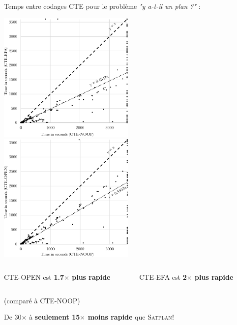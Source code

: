 \documentclass[english,french,usenames,dvipsnames]{beamer}
\begin{document}
\begin{frame}
Temps entre codages CTE pour le problème \textit{"y a-t-il un plan ?"} :

\includegraphics[width=0.5\textwidth]{figures/coplas2018/time-plansat-efa-noop3.pdf}
\includegraphics[width=0.5\textwidth]{figures/coplas2018/time-plansat-open-noop3.pdf}

\begin{columns}
\begin{column}{0.5\textwidth}
\begin{center}
CTE-OPEN est \textbf{1.7$\times$ plus rapide}
\end{center}
\end{column}
\begin{column}{0.5\textwidth}
\begin{center}
CTE-EFA est \textbf{2$\times$ plus rapide}
\end{center}
\end{column}
\end{columns}

\begin{small}\begin{center}
(comparé à CTE-NOOP)
\end{center} \end{small}
\begin{center}
De 30$\times$ à \textbf{seulement 15$\times$ moins rapide} que \textsc{Satplan}!
\end{center}
\end{frame}
\end{document}
